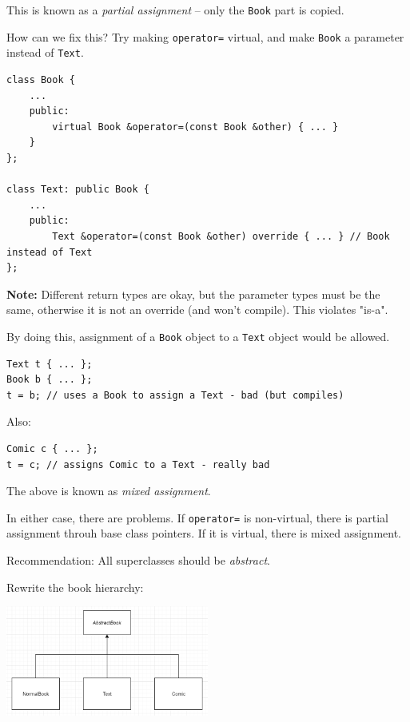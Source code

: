 \documentclass[11pt]{article}
\theoremstyle{definition}
\begin{document}
This is known as a {\it partial assignment} -- only the {\tt Book} part is copied. 

How can we fix this? Try making {\tt operator=} virtual, and make {\tt Book} a parameter instead of {\tt Text}. 
\begin{lstlisting}
class Book {
    ...
    public:
        virtual Book &operator=(const Book &other) { ... }
    }
};

class Text: public Book {
    ...
    public:
        Text &operator=(const Book &other) override { ... } // Book instead of Text
};
\end{lstlisting}
\vspace{-0.25cm}
{\bf Note:} Different return types are okay, but the parameter types must be the same, otherwise it is not an override (and won't compile). This violates "is-a".

By doing this, assignment of a {\tt Book} object to a {\tt Text} object would be allowed.
\begin{lstlisting}
Text t { ... };
Book b { ... };
t = b; // uses a Book to assign a Text - bad (but compiles)
\end{lstlisting}
\vspace{-0.25cm}
Also:
\begin{lstlisting}
Comic c { ... };
t = c; // assigns Comic to a Text - really bad
\end{lstlisting}
\vspace{-0.25cm}
The above is known as {\it mixed assignment}.

In either case, there are problems. If {\tt operator=} is non-virtual, there is partial assignment throuh base class pointers. If it is virtual, there is mixed assignment.

Recommendation: All superclasses should be {\it abstract}.

\newpage
Rewrite the book hierarchy:
\begin{center}
\includegraphics[width=0.5\textwidth]{images/hierarchy.png}
\end{center}
\end{document}
